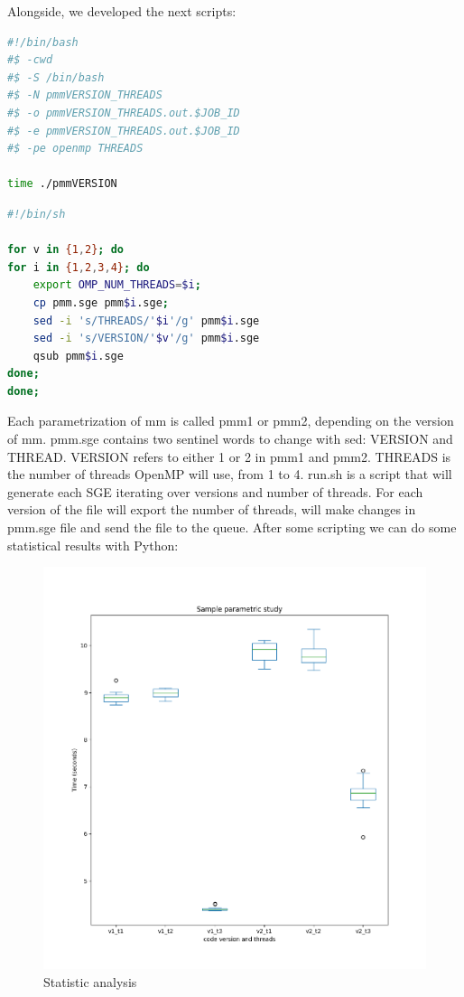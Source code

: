 \documentclass[11pt]{article}
\begin{document}
Alongside, we developed the next scripts:

\begin{lstlisting}[language=bash,caption=pmm.sge: SGE template file]
#!/bin/bash
#$ -cwd
#$ -S /bin/bash
#$ -N pmmVERSION_THREADS
#$ -o pmmVERSION_THREADS.out.$JOB_ID
#$ -e pmmVERSION_THREADS.out.$JOB_ID
#$ -pe openmp THREADS

time ./pmmVERSION
\end{lstlisting}

\begin{lstlisting}[language=bash,caption=run.sh: Helper script]
#!/bin/sh

for v in {1,2}; do
for i in {1,2,3,4}; do
	export OMP_NUM_THREADS=$i;
	cp pmm.sge pmm$i.sge;
	sed -i 's/THREADS/'$i'/g' pmm$i.sge
	sed -i 's/VERSION/'$v'/g' pmm$i.sge
	qsub pmm$i.sge
done;
done;
\end{lstlisting}

Each parametrization of mm is called pmm1 or pmm2, depending on the version of mm. pmm.sge contains two sentinel words to change with sed: VERSION and THREAD. VERSION refers to either 1 or 2 in pmm1 and pmm2. THREADS is the number of threads OpenMP will use, from 1 to 4.
run.sh is a script that will generate each SGE iterating over versions and number of threads. For each version of the file will export the number of threads, will make changes in pmm.sge file and send the file to the queue. After some scripting we can do some statistical results with Python:

\begin{figure}[h!]
    \centering
    \includegraphics{2.png}
    \caption{Statistic analysis}
    \label{fig:1}
\end{figure}
\end{document}
